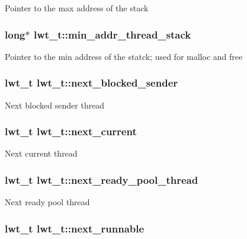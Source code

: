 Pointer to the max address of the stack \hypertarget{structlwt_a62ea9a882e0a197b9b076e1e018048d7}{
\subsubsection[{min\+\_\+addr\+\_\+thread\+\_\+stack}]{\setlength{\rightskip}{0pt plus 5cm}long$\ast$ lwt\+\_\+t\+::min\+\_\+addr\+\_\+thread\+\_\+stack}}\label{structlwt_a62ea9a882e0a197b9b076e1e018048d7}
Pointer to the min address of the statck; used for malloc and free \hypertarget{structlwt_a3998a6f0e9400a8cd5534b76a9bdb843}{
\subsubsection[{next\+\_\+blocked\+\_\+sender}]{\setlength{\rightskip}{0pt plus 5cm}lwt\+\_\+t lwt\+\_\+t\+::next\+\_\+blocked\+\_\+sender}}\label{structlwt_a3998a6f0e9400a8cd5534b76a9bdb843}
Next blocked sender thread \hypertarget{structlwt_a96a9b5218a20b704188442a3056601ae}{
\subsubsection[{next\+\_\+current}]{\setlength{\rightskip}{0pt plus 5cm}lwt\+\_\+t lwt\+\_\+t\+::next\+\_\+current}}\label{structlwt_a96a9b5218a20b704188442a3056601ae}
Next current thread \hypertarget{structlwt_a79a02c75963b9354392360d99cc6a468}{
\subsubsection[{next\+\_\+ready\+\_\+pool\+\_\+thread}]{\setlength{\rightskip}{0pt plus 5cm}lwt\+\_\+t lwt\+\_\+t\+::next\+\_\+ready\+\_\+pool\+\_\+thread}}\label{structlwt_a79a02c75963b9354392360d99cc6a468}
Next ready pool thread \hypertarget{structlwt_a1636aae4155df6a60c90c7ab737687e4}{
\subsubsection[{next\+\_\+runnable}]{\setlength{\rightskip}{0pt plus 5cm}lwt\+\_\+t lwt\+\_\+t\+::next\+\_\+runnable}}\label{structlwt_a1636aae4155df6a60c90c7ab737687e4}
